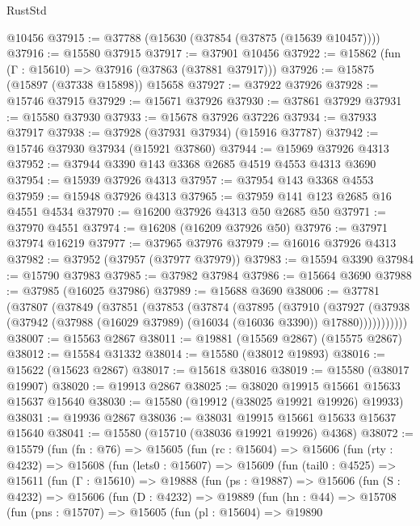 \begin{lexlean}{RustStd}
\begin{coremodule}
    @10456
@37915 := @37788 (@15630 (@37854 (@37875 (@15639 @10457))))
@37916 := @15580 @37915
@37917 := @37901 @10456
@37922 := @15862 (fun (Γ : @15610) => @37916 (@37863 (@37881 @37917)))
@37926 := @15875 (@15897 (@37338 @15898)) @15658
@37927 := @37922 @37926
@37928 := @15746 @37915
@37929 := @15671 @37926
@37930 := @37861 @37929
@37931 := @15580 @37930
@37933 := @15678 @37926 @37226
@37934 := @37933 @37917
@37938 := @37928 (@37931 @37934) (@15916 @37787)
@37942 := @15746 @37930 @37934 (@15921 @37860)
@37944 := @15969 @37926 @4313
@37952 := @37944 @3390 @143 @3368 @2685 @4519 @4553 @4313 @3690
@37954 := @15939 @37926 @4313
@37957 := @37954 @143 @3368 @4553
@37959 := @15948 @37926 @4313
@37965 := @37959 @141 @123 @2685 @16 @4551 @4534
@37970 := @16200 @37926 @4313 @50 @2685 @50
@37971 := @37970 @4551
@37974 := @16208 (@16209 @37926 @50)
@37976 := @37971 @37974 @16219
@37977 := @37965 @37976
@37979 := @16016 @37926 @4313
@37982 := @37952 (@37957 (@37977 @37979))
@37983 := @15594 @3390
@37984 := @15790 @37983
@37985 := @37982 @37984
@37986 := @15664 @3690
@37988 := @37985 (@16025 @37986)
@37989 := @15688 @3690
@38006 := @37781
    (@37807
      (@37849
        (@37851
          (@37853
            (@37874
              (@37895
                (@37910
                  (@37927
                    (@37938
                      (@37942 (@37988 (@16029 @37989) (@16034 (@16036 @3390)) @17880)))))))))))
@38007 := @15563 @2867
@38011 := @19881 (@15569 @2867) (@15575 @2867)
@38012 := @15584 @31332
@38014 := @15580 (@38012 @19893)
@38016 := @15622 (@15623 @2867)
@38017 := @15618 @38016
@38019 := @15580 (@38017 @19907)
@38020 := @19913 @2867
@38025 := @38020 @19915 @15661 @15633 @15637 @15640
@38030 := @15580 (@19912 (@38025 @19921 @19926) @19933)
@38031 := @19936 @2867
@38036 := @38031 @19915 @15661 @15633 @15637 @15640
@38041 := @15580 (@15710 (@38036 @19921 @19926) @4368)
@38072 := @15579
    (fun (fn : @76) =>
    @15605
      (fun (rc : @15604) =>
      @15606
        (fun (rty : @4232) =>
        @15608
          (fun (lets0 : @15607) =>
          @15609
            (fun (tail0 : @4525) =>
            @15611
              (fun (Γ : @15610) =>
              @19888
                (fun (ps : @19887) =>
                @15606
                  (fun (S : @4232) =>
                  @15606
                    (fun (D : @4232) =>
                    @19889
                      (fun (hn : @44) =>
                      @15708
                        (fun (pns : @15707) =>
                        @15605
                          (fun (pl : @15604) =>
                          @19890

\end{coremodule}
\end{lexlean}
